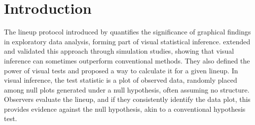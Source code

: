 \documentclass[10pt]{article}\usepackage[]{graphicx}\usepackage[]{xcolor}
\begin{document}
\section{Introduction}  




The lineup protocol introduced by \citet{buja:2009} quantifies the significance of graphical findings in exploratory data analysis, forming part of visual statistical inference. \citet{majumder:2013} extended and validated this approach through simulation studies, showing that visual inference can sometimes outperform conventional methods. They also defined the power of visual tests and proposed a way to calculate it for a given lineup. In visual inference, the test statistic is a plot of observed data, randomly placed among null plots generated under a null hypothesis, often assuming no structure. Observers evaluate the lineup, and if they consistently identify the data plot, this provides evidence against the null hypothesis, akin to a conventional hypothesis test.
\end{document}
